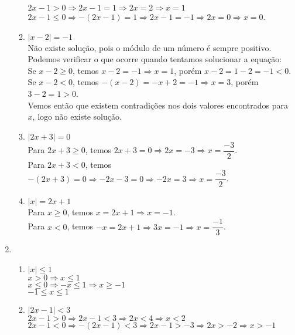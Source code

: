 \begin{enumerate}
\begin{enumerate}
		$2x - 1 > 0 \Rightarrow 2x - 1 = 1 \Rightarrow 2x = 2 \Rightarrow x = 1$\\
		$2x - 1 \leq 0 \Rightarrow -(2x - 1) = 1 \Rightarrow 2x - 1 = -1 \Rightarrow 2x = 0 \Rightarrow x = 0$.	
		\item %
		$\vert x - 2 \vert = -1$\\
		Não existe solução, pois o módulo de um número é sempre positivo.\\
		Podemos verificar o que ocorre quando tentamos solucionar a equação:\\
		Se $ x - 2 \geq 0$, temos $x - 2 = -1 \Rightarrow x = 1$, porém $x - 2 = 1 - 2 = -1 <  0$.\\
		Se $ x - 2  < 0$, temos $-(x - 2) = -x + 2 = -1 \Rightarrow x = 3$, porém $3 - 2 = 1 > 0$.\\
		Vemos então que existem contradições nos dois valores encontrados para $x$, logo não existe solução.
		\item %
		$\vert2x + 3 \vert = 0$\\
		Para $2x + 3 \geq 0$, temos $2x + 3 = 0 \Rightarrow 2x = -3 \Rightarrow x = \dfrac{-3}{2}$.\\
		Para $2x + 3 < 0$, temos $-(2x + 3) = 0 \Rightarrow -2x - 3 = 0\Rightarrow -2x = 3 \Rightarrow x = \dfrac{-3}{2}$.
		\item %
		$\vert x \vert = 2x + 1$\\
		Para $x \geq 0$, temos $x = 2x + 1 \Rightarrow x =-1$.\\
		Para $x < 0$, temos $-x = 2x + 1 \Rightarrow 3x = -1 \Rightarrow x = \dfrac{-1}{3}$.
	\end{enumerate}
	\item %
	\begin{enumerate}
		\setcounter{enumii}{0}
		\item %
		$\vert x \vert \leq 1$\\
		$ x > 0 \Rightarrow x \leq 1$\\
		$ x \leq 0 \Rightarrow -x \leq 1 \Rightarrow x \geq -1$\\
		$-1 \leq x \leq 1$
		\item %
		$\vert 2x - 1 \vert < 3$\\		
		$2x - 1 > 0 \Rightarrow 2x - 1 < 3 \Rightarrow 2x < 4 \Rightarrow x < 2$\\
		$2x - 1 < 0 \Rightarrow -(2x - 1) < 3 \Rightarrow 2x - 1 > -3  \Rightarrow 2x > -2 \Rightarrow x > -1$\\

\end{enumerate}
\end{enumerate}
